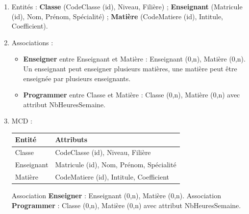 \begin{enumerate}
    \item Entités : \textbf{Classe} (CodeClasse (id), Niveau, Filière) ; \textbf{Enseignant} (Matricule (id), Nom, Prénom, Spécialité) ; \textbf{Matière} (CodeMatiere (id), Intitule, Coefficient).
    \item Associations :
    \begin{itemize}
        \item \textbf{Enseigner} entre Enseignant et Matière : Enseignant (0,n), Matière (0,n). Un enseignant peut enseigner plusieurs matières, une matière peut être enseignée par plusieurs enseignants.
        \item \textbf{Programmer} entre Classe et Matière : Classe (0,n), Matière (0,n) avec attribut NbHeuresSemaine.
    \end{itemize}
    \item MCD :
    \begin{center}
    \begin{tabular}{|l|l|}
    \hline
    \textbf{Entité} & \textbf{Attributs} \\
    \hline
    Classe & CodeClasse (id), Niveau, Filière \\
    \hline
    Enseignant & Matricule (id), Nom, Prénom, Spécialité \\
    \hline
    Matière & CodeMatiere (id), Intitule, Coefficient \\
    \hline
    \end{tabular}
    \end{center}
    Association \textbf{Enseigner} : Enseignant (0,n), Matière (0,n).
    Association \textbf{Programmer} : Classe (0,n), Matière (0,n) avec attribut NbHeuresSemaine.
\end{enumerate}